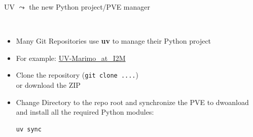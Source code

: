 \documentclass[11pt, serif, mathserif, compress]{beamer}  %
\begin{document}
\begin{frame}[fragile]{UV $\leadsto$ the new Python project/PVE manager}
  
  \begin{bclogo}[noborder=true, couleur=gray!20, couleurBarre=Chocolate, logo=\raisebox{1mm}{\,\huge⚙}, marge=0, margeG=-0.6, margeD=-0.6,]
    {\ }
    \smallskip

    \begin{minipage}[t][][t]{1.\textwidth}
      \begin{itemize}\setlength\itemsep{3mm}
      \item<2-> Many Git Repositories use {\bf uv} to manage their Python project

      \item<3-> For example: \href{https://github.com/cjlux/UV-Marimo_at_I2M}{UV-Marimo\_at\_I2M}
        
      \item<4-> Clone the repository (\texttt{git clone ....})\\
        or download the ZIP
        
      \item<5-> Change Directory to the repo root and synchronize the PVE to dwoanload and install all the required Python modules:
        \begin{verbatim}
uv sync
        \end{verbatim}
      
      \end{itemize}
    \end{minipage}\begin{minipage}[t][][b]{.1\textwidth}
    \end{minipage}
  \end{bclogo}
  \vfill
\end{frame}
\end{document}
